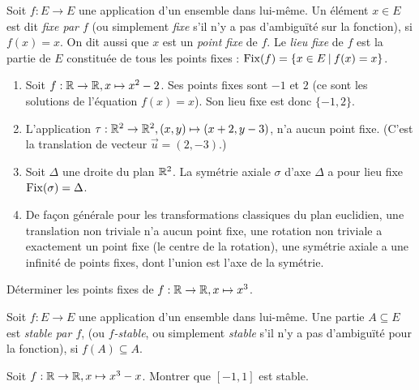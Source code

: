 \begin{definition}
Soit $f : E\to E$ une application d'un ensemble dans lui-même. Un élément $x\in E$ est dit \emph{fixe par $f$} (ou simplement \emph{fixe} s'il n'y a pas d'ambiguïté sur la fonction), si $f(x)=x$. On dit aussi que $x$ est un \emph{point fixe} de $f$. Le \emph{lieu fixe} de $f$ est la partie de $E$ constituée de tous les points fixes : $\operatorname{Fix}(f) = \{x\in E\:|\: f(x)=x \}$.
\end{definition}

\begin{exemple}
\begin{enumerate}
\item Soit $f : \mathbb{R}\to \mathbb{R}, x\mapsto x^2-2$. Ses points fixes sont $-1$ et $2$ (ce sont les solutions de l'équation $f(x)=x$). Son lieu fixe est donc $\{-1,2\}$.
\item L'application $\tau : \mathbb{R}^2\to \mathbb{R}^2, (x,y) \mapsto (x+2,y-3)$, n'a aucun point fixe. (C'est la translation de vecteur $\vec u = (2,-3)$.)
\item Soit $\Delta$ une droite du plan $\mathbb{R}^2$. La symétrie axiale $\sigma$ d'axe $\Delta$ a pour lieu fixe $\operatorname{Fix}(\sigma)=\Delta$.
\item De façon générale pour les transformations classiques du plan euclidien, une translation non triviale n'a aucun point fixe, une rotation non triviale a exactement un point fixe (le centre de la rotation), une symétrie axiale a une infinité de points fixes, dont l'union est l'axe de la symétrie.
\end{enumerate}
\end{exemple}

\begin{exercice}
Déterminer les points fixes de $f : \mathbb{R}\to \mathbb{R}, x\mapsto x^3$.
\end{exercice}

\begin{definition}
Soit $f : E\to E$ une application d'un ensemble dans lui-même. Une partie $A\subseteq E$ est \emph{stable par $f$}, (ou \emph{$f$-stable}, ou simplement \emph{stable} s'il n'y a pas d'ambiguïté pour la fonction), si $f(A)\subseteq A$.
\end{definition}

\begin{exercice}
Soit $f : \mathbb{R}\to \mathbb{R}, x\mapsto x^3-x$. Montrer que $[-1,1]$ est stable.
\end{exercice}

